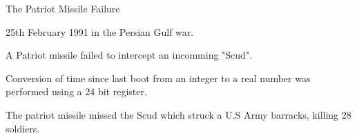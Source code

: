 \documentclass[13pt]{beamer}
\begin{document}
%

\begin{frame}{The Patriot Missile Failure}
  \begin{block}{}
    25th February 1991 in the Persian Gulf war.
  \end{block}

  \pause

  \begin{block}{}
     A Patriot missile failed to intercept an incomming "Scud".
  \end{block}

  \pause

  \begin{block}{}
     Conversion of time since last boot from an integer to a real number was performed using a 24 bit register.
  \end{block}

  \pause

  \begin{block}{}
     The patriot missile missed the Scud which struck a U.S Army barracks, killing 28 soldiers.
  \end{block}

\end{frame}
\end{document}
